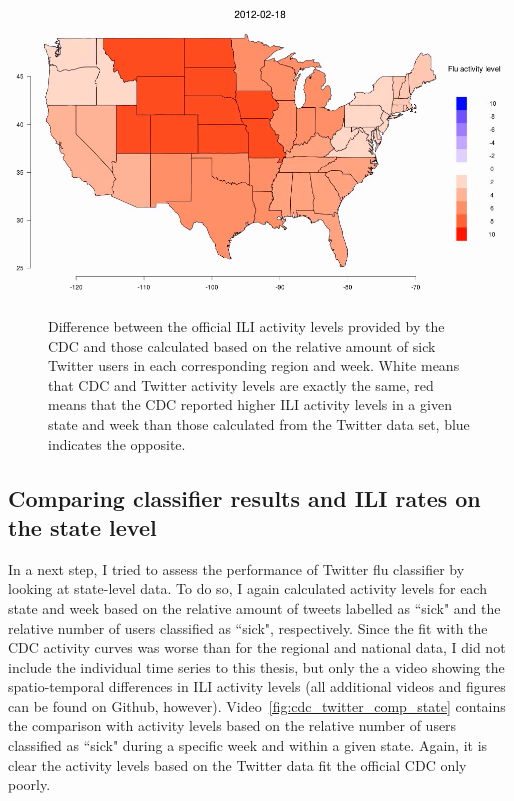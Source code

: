 \documentclass[11pt, a4paper,twoside]{report}\usepackage[]{graphicx}\usepackage[]{color}
\begin{document}
\begin{center}
\href{run:vids/3_cdc_twitter_diff_user_regio.avi}{\includegraphics[width=0.9\linewidth]{vids/3_cdc_twitter_diff_user_regio.png}}
\end{center}
\begin{figure}[H]
\centering
  \caption{Difference between the official ILI activity levels provided by the CDC and those calculated based on the relative amount of sick Twitter users in each corresponding region and week. White means that CDC and Twitter activity levels are exactly the same, red means that the CDC reported higher ILI activity levels in a given state and week than those calculated from the Twitter data set, blue indicates the opposite.}
    \label{fig:cdc_twitter_comp_regio}
\end{figure}

\subsection{Comparing classifier results and ILI rates on the state level}
\label{sec:comp_cdc_state}
In a next step, I tried to assess the performance of Twitter flu classifier by looking at state-level data. To do so, I again calculated activity levels for each state and week based on the relative amount of tweets labelled as ``sick" and the relative number of users classified as ``sick", respectively. Since the fit with the CDC activity curves was worse than for the regional and national data, I did not include the individual time series to this thesis, but only the a video showing the spatio-temporal differences in ILI activity levels (all additional videos and figures can be found on Github, however). Video~\ref{fig:cdc_twitter_comp_state} contains the comparison with activity levels based on the relative number of users classified as ``sick" during a specific week and within a given state. Again, it is clear the activity levels based on the Twitter data fit the official CDC only poorly.
\end{document}
